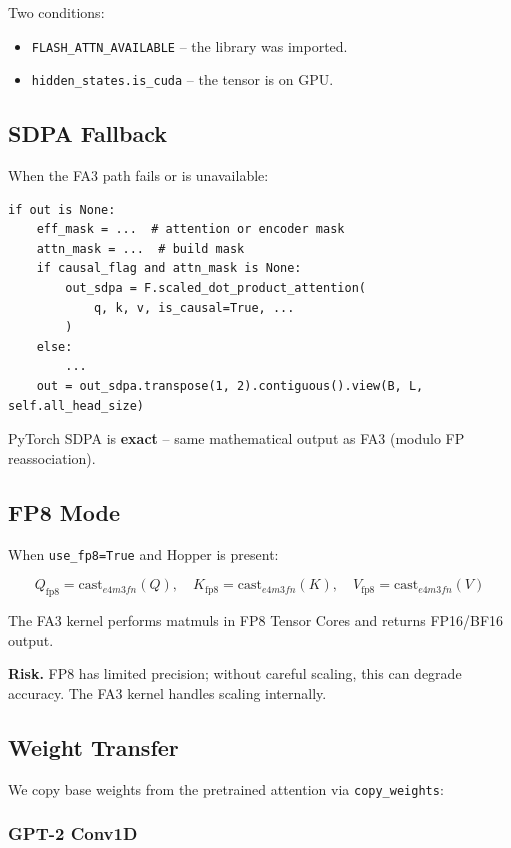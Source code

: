 Two conditions:
\begin{itemize}
\item \texttt{FLASH\_ATTN\_AVAILABLE} -- the library was imported.
\item \texttt{hidden\_states.is\_cuda} -- the tensor is on GPU.

\end{itemize}
\subsection{SDPA Fallback}

When the FA3 path fails or is unavailable:

\begin{lstlisting}
if out is None:
    eff_mask = ...  # attention or encoder mask
    attn_mask = ...  # build mask
    if causal_flag and attn_mask is None:
        out_sdpa = F.scaled_dot_product_attention(
            q, k, v, is_causal=True, ...
        )
    else:
        ...
    out = out_sdpa.transpose(1, 2).contiguous().view(B, L, self.all_head_size)
\end{lstlisting}

PyTorch SDPA is \textbf{exact} -- same mathematical output as FA3 (modulo FP 
reassociation).

\subsection{FP8 Mode}

When \texttt{use\_fp8=True} and Hopper is present:

\[
Q_\text{fp8} = \text{cast}_{e4m3fn}(Q), \quad
K_\text{fp8} = \text{cast}_{e4m3fn}(K), \quad
V_\text{fp8} = \text{cast}_{e4m3fn}(V)
\tag{4.1}
\]

The FA3 kernel performs matmuls in FP8 Tensor Cores and returns FP16/BF16 
output.

\textbf{Risk.} FP8 has limited precision; without careful scaling, this can 
degrade accuracy. The FA3 kernel handles scaling internally.

\subsection{Weight Transfer}

We copy base weights from the pretrained attention via \texttt{copy\_weights}:

\subsubsection{GPT-2 Conv1D}

